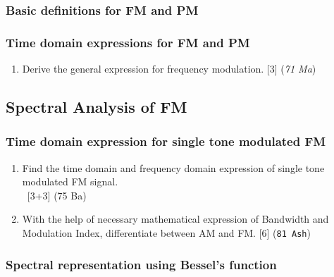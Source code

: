 \documentclass[12pt]{article}
\newcommand{\enter}{\\\textcolor{white}{1}}
\begin{document}
    \subsubsection{Basic definitions for FM and PM}
    \subsubsection{Time domain expressions for FM and PM}
      \begin{enumerate}
        \item Derive the general expression for frequency modulation. \hfill [3] (\textit{71 Ma})
      \end{enumerate}

  \subsection{Spectral Analysis of FM}
    \subsubsection{Time domain expression for single tone modulated FM}
      \begin{enumerate}
        \item Find the time domain and frequency domain expression of single tone modulated FM signal.
        \enter\hfill [3+3] (75 Ba)

        \item With the help of necessary mathematical expression of Bandwidth and Modulation Index, differentiate between AM and FM. \hfill [6] (\texttt{81 Ash})
      \end{enumerate}

    \subsubsection{Spectral representation using Bessel's function}
\end{document}
